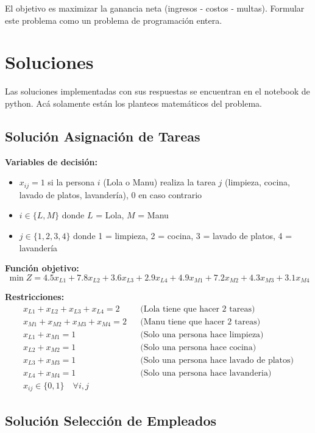 \documentclass[12pt]{article}
\begin{document}
El objetivo es maximizar la ganancia neta (ingresos - costos - multas). Formular este problema como un problema de programación entera.

\newpage

\section{Soluciones}

Las soluciones implementadas con sus respuestas se encuentran en el notebook de python. Acá solamente están los planteos matemáticos del problema.

\subsection{Solución Asignación de Tareas}

\textbf{Variables de decisión:}
\begin{itemize}
    \item $x_{ij} = 1$ si la persona $i$ (Lola o Manu) realiza la tarea $j$ (limpieza, cocina, lavado de platos, lavandería), 0 en caso contrario
    \item $i \in \{L, M\}$ donde $L$ = Lola, $M$ = Manu
    \item $j \in \{1, 2, 3, 4\}$ donde 1 = limpieza, 2 = cocina, 3 = lavado de platos, 4 = lavandería
\end{itemize}

\textbf{Función objetivo:}
$$\min Z = 4.5x_{L1} + 7.8x_{L2} + 3.6x_{L3} + 2.9x_{L4} + 4.9x_{M1} + 7.2x_{M2} + 4.3x_{M3} + 3.1x_{M4}$$

\textbf{Restricciones:}
\begin{align*}
    x_{L1} + x_{L2} + x_{L3} + x_{L4} = 2 && \text{(Lola tiene que hacer 2 tareas)} \\
    x_{M1} + x_{M2} + x_{M3} + x_{M4} = 2 && \text{(Manu tiene que hacer 2 tareas)} \\
    x_{L1} + x_{M1} = 1 && \text{(Solo una persona hace limpieza)} \\
    x_{L2} + x_{M2} = 1 && \text{(Solo una persona hace cocina)} \\
    x_{L3} + x_{M3} = 1 && \text{(Solo una persona hace lavado de platos)} \\
    x_{L4} + x_{M4} = 1 && \text{(Solo una persona hace lavanderia)} \\
    x_{ij} \in \{0,1\} \quad \forall i,j
\end{align*}

\subsection{Solución Selección de Empleados}
\end{document}
